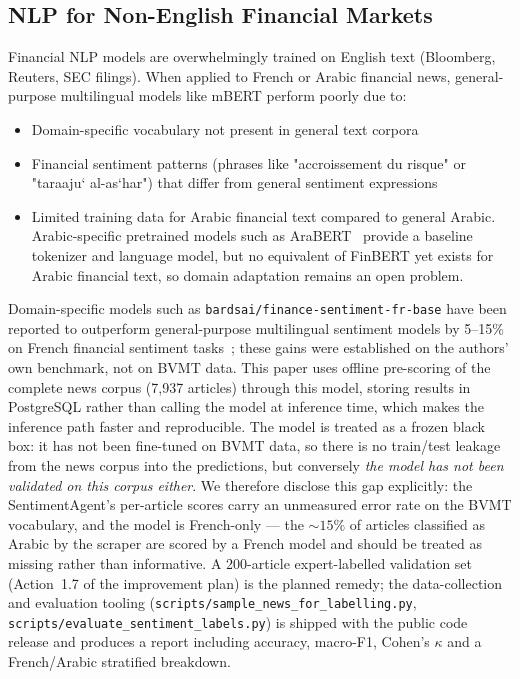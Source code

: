\documentclass[conference]{IEEEtran}
\begin{document}
\subsection{NLP for Non-English Financial Markets}

Financial NLP models are overwhelmingly trained on English text (Bloomberg, Reuters, SEC filings). When applied to French or Arabic financial news, general-purpose multilingual models like mBERT perform poorly due to:
\begin{itemize}
\item Domain-specific vocabulary not present in general text corpora
\item Financial sentiment patterns (phrases like "accroissement du risque" or "taraaju` al-as`har") that differ from general sentiment expressions
\item Limited training data for Arabic financial text compared to general Arabic. Arabic-specific pretrained models such as AraBERT~\cite{ref:arabert} provide a baseline tokenizer and language model, but no equivalent of FinBERT yet exists for Arabic financial text, so domain adaptation remains an open problem.
\end{itemize}

Domain-specific models such as \texttt{bardsai/finance-sentiment-fr-base} have been reported to outperform general-purpose multilingual sentiment models by 5--15\% on French financial sentiment tasks~\cite{ref:financial_nlp}; these gains were established on the authors' own benchmark, not on BVMT data. This paper uses offline pre-scoring of the complete news corpus (7{,}937 articles) through this model, storing results in PostgreSQL rather than calling the model at inference time, which makes the inference path faster and reproducible. The model is treated as a frozen black box: it has not been fine-tuned on BVMT data, so there is no train/test leakage from the news corpus into the predictions, but conversely \emph{the model has not been validated on this corpus either}. We therefore disclose this gap explicitly: the SentimentAgent's per-article scores carry an unmeasured error rate on the BVMT vocabulary, and the model is French-only --- the $\sim 15\%$ of articles classified as Arabic by the scraper are scored by a French model and should be treated as missing rather than informative. A 200-article expert-labelled validation set (Action~1.7 of the improvement plan) is the planned remedy; the data-collection and evaluation tooling (\texttt{scripts/sample\_news\_for\_labelling.py}, \texttt{scripts/evaluate\_sentiment\_labels.py}) is shipped with the public code release and produces a report including accuracy, macro-F1, Cohen's $\kappa$ and a French/Arabic stratified breakdown.
\end{document}
